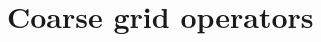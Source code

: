 \documentclass[18pt,xcolor=table]{beamer}
\begin{document}


\section{Coarse grid operators}

\begin{frame}{}
\begin{block}{}
\bit
\item 
\eit
\end{block}
\end{frame}


\end{document}
